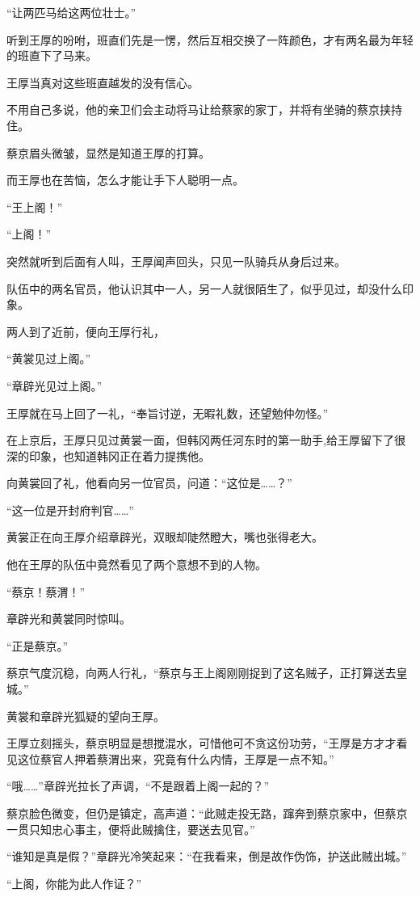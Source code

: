 “让两匹马给这两位壮士。”

听到王厚的吩咐，班直们先是一愣，然后互相交换了一阵颜色，才有两名最为年轻的班直下了马来。

王厚当真对这些班直越发的没有信心。

不用自己多说，他的亲卫们会主动将马让给蔡家的家丁，并将有坐骑的蔡京挟持住。

蔡京眉头微皱，显然是知道王厚的打算。

而王厚也在苦恼，怎么才能让手下人聪明一点。

“王上阁！”

“上阁！”

突然就听到后面有人叫，王厚闻声回头，只见一队骑兵从身后过来。

队伍中的两名官员，他认识其中一人，另一人就很陌生了，似乎见过，却没什么印象。

两人到了近前，便向王厚行礼，

“黄裳见过上阁。”

“章辟光见过上阁。”

王厚就在马上回了一礼，“奉旨讨逆，无暇礼数，还望勉仲勿怪。”

在上京后，王厚只见过黄裳一面，但韩冈两任河东时的第一助手,给王厚留下了很深的印象，也知道韩冈正在着力提携他。

向黄裳回了礼，他看向另一位官员，问道：“这位是……？”

“这一位是开封府判官……”

黄裳正在向王厚介绍章辟光，双眼却陡然瞪大，嘴也张得老大。

他在王厚的队伍中竟然看见了两个意想不到的人物。

“蔡京！蔡渭！”

章辟光和黄裳同时惊叫。

“正是蔡京。”

蔡京气度沉稳，向两人行礼，“蔡京与王上阁刚刚捉到了这名贼子，正打算送去皇城。”

黄裳和章辟光狐疑的望向王厚。

王厚立刻摇头，蔡京明显是想搅混水，可惜他可不贪这份功劳，“王厚是方才才看见这位蔡官人押着蔡渭出来，究竟有什么内情，王厚是一点不知。”

“哦……”章辟光拉长了声调，“不是跟着上阁一起的？”

蔡京脸色微变，但仍是镇定，高声道：“此贼走投无路，蹿奔到蔡京家中，但蔡京一贯只知忠心事主，便将此贼擒住，要送去见官。”

“谁知是真是假？”章辟光冷笑起来：“在我看来，倒是故作伪饰，护送此贼出城。”

“上阁，你能为此人作证？”


